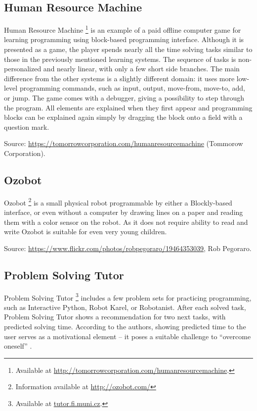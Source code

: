 \subsection{Human Resource Machine}
\label{sec:human-resource-machine}
Human Resource Machine%
\footnote{Available at \url{http://tomorrowcorporation.com/humanresourcemachine}.}
is an example of a paid offline computer game for learning programming using block-based programming interface.
Although it is presented as a game,
the player spends nearly all the time solving tasks similar to those in the previously mentioned learning systems.
The sequence of tasks is non-personalized and nearly linear,
with only a few short side branches.
The main difference from the other systems is a slightly different domain:
it uses more low-level programming commands, such as
input, output, move-from, move-to, add, or jump.
The game comes with a debugger, giving a possibility to step through the program.
All elements are explained when they first appear and programming blocks can be explained again simply by dragging the block onto a field with a question mark.

%
{Source: \url{https://tomorrowcorporation.com/humanresourcemachine} (Tommorow Corporation).}


\subsection{Ozobot}
\label{sec:ozobot}
Ozobot%
\footnote{Information available at \url{http://ozobot.com/}}
is a small physical robot
programmable by either a Blockly-based interface,
  or even without a computer
  by drawing lines on a paper and reading them with a color sensor on the robot.
As it does not require ability to read and write
  Ozobot is suitable for even very young children.


%
{Source: \url{https://www.flickr.com/photos/robpegoraro/19464353039}, Rob Pegoraro.}



\subsection{Problem Solving Tutor}
\label{sec:problem-solving-tutor}
Problem Solving Tutor%
\footnote{Available at \url{tutor.fi.muni.cz}.}
includes a few problem sets for practicing programming,
such as Interactive Python, Robot Karel, or Robotanist.
After each solved task, Problem Solving Tutor shows a recommendation for two next tasks,
with predicted solving time.
According to the authors, showing predicted time to the user serves as a motivational element
-- it poses a suitable challenge to ``overcome oneself''
\cite{pelanek-student-modeling-times}.

